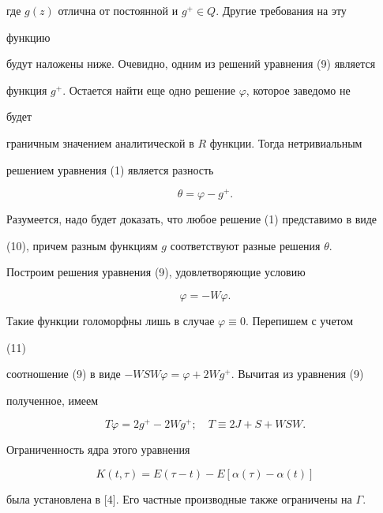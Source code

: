 где $g(z)$ отлична от постоянной и $g^+\in Q$. Другие требования на эту 


функцию 


будут наложены ниже. Очевидно, одним из решений уравнения (9) является 


функция $g^+$. Остается найти еще одно решение $\varphi$, которое заведомо не 


будет 


граничным значением аналитической в $R$ функции. Тогда нетривиальным 


решением уравнения (1) является разность 


\begin{equation} 


\theta=\varphi-g^+. 


\end{equation} 


Разумеется, надо будет доказать, что любое решение (1) представимо в виде 


(10), причем разным функциям $g$ соответствуют разные решения $\theta$. 


 


Построим решения уравнения (9), удовлетворяющие условию 


\begin{equation} 


\varphi=-W\varphi. 


\end{equation} 


Такие функции голоморфны лишь в случае $\varphi\equiv0$. Перепишем с учетом 


(11) 


соотношение (9) в виде $-WSW\varphi=\varphi+2Wg^+$. Вычитая из уравнения (9) 


полученное, имеем 


\begin{equation} 


T\varphi=2g^+-2Wg^+;\quad T\equiv2J+S+WSW. 


\end{equation} 


Ограниченность ядра этого уравнения 


\begin{equation} 


K(t,\tau)=E(\tau-t)-E[\alpha(\tau)-\alpha(t)] 


\end{equation} 


была установлена в [4]. Его частные производные также ограничены на $\Gamma$. 


